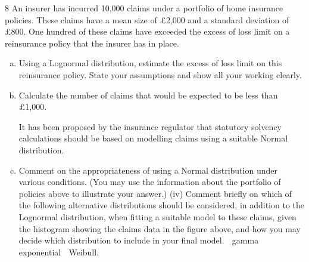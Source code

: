 \documentclass[a4paper,12pt]{article}
\begin{document}

8 An insurer has incurred 10,000 claims under a portfolio of home insurance policies.
These claims have a mean size of £2,000 and a standard deviation of £800. One
hundred of these claims have exceeded the excess of loss limit on a reinsurance policy
that the insurer has in place.

\begin{enumerate}[(a)]
\item Using a Lognormal distribution, estimate the excess of loss limit on this
reinsurance policy. State your assumptions and show all your working clearly.
\item Calculate the number of claims that would be expected to be less than £1,000.

It has been proposed by the insurance regulator that statutory solvency calculations
should be based on modelling claims using a suitable Normal distribution.
\item Comment on the appropriateness of using a Normal distribution under various
conditions. (You may use the information about the portfolio of policies above
to illustrate your answer.) 
(iv) Comment briefly on which of the following alternative distributions should be
considered, in addition to the Lognormal distribution, when fitting a suitable
model to these claims, given the histogram showing the claims data in the
figure above, and how you may decide which distribution to include in your
final model.
 gamma
 exponential
 Weibull.
\end{enumerate}

\newpage
\end{document}
